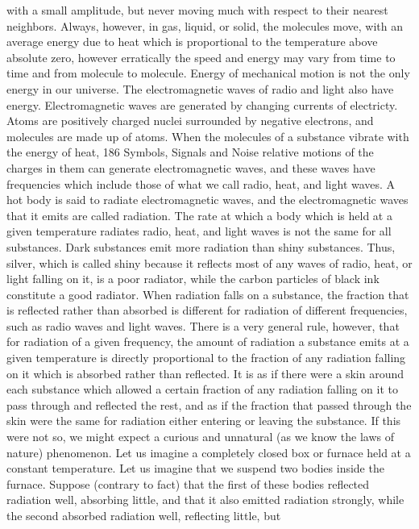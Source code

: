 {{{{{{{{{{{with a small amplitude, but never moving much with respect to
their nearest neighbors. Always, however, in gas, liquid, or solid,
the molecules move, with an average energy due to heat which is
proportional to the temperature above absolute zero, however
erratically the speed and energy may vary from time to time and
from molecule to molecule.
Energy of mechanical motion is not the only energy in our
universe. The electromagnetic waves of radio and light also have
energy. Electromagnetic waves are generated by changing currents
of electricty. Atoms are positively charged nuclei surrounded by
negative electrons, and molecules are made up of atoms. When
the molecules of a substance vibrate with the energy of heat,
186
Symbols,
Signals and Noise
relative motions of the charges in them can generate electromagnetic
waves, and these waves have frequencies which include those
of what we call radio, heat, and light waves. A hot body is said
to radiate electromagnetic waves, and the electromagnetic waves
that it emits are called radiation.
The rate at which a body which is held at a given temperature
radiates radio, heat, and light waves is not the same for all substances.
Dark substances emit more radiation than shiny substances.
Thus, silver, which is called shiny because it reflects most
of any waves of radio, heat, or light falling on it, is a poor radiator,
while the carbon particles of black ink constitute a good radiator.
When radiation falls on a substance, the fraction that is reflected
rather than absorbed is different for radiation of different frequencies,
such as radio waves and light waves. There is a very general
rule, however, that for radiation of a given frequency, the amount
of radiation a substance emits at a given temperature is directly
proportional to the fraction of any radiation falling on it which is
absorbed rather than reflected. It is as if there were a skin around
each substance which allowed a certain fraction of any radiation
falling on it to pass through and reflected the rest, and as if the
fraction that passed through the skin were the same for radiation
either entering or leaving the substance.
If this were not so, we might expect a curious and unnatural (as
we know the laws of nature) phenomenon. Let us imagine a completely
closed box or furnace held at a constant temperature. Let
us imagine that we suspend two bodies inside the furnace. Suppose
(contrary to fact) that the first of these bodies reflected radiation
well, absorbing little, and that it also emitted radiation strongly,
while the second absorbed radiation well, reflecting little, but
}}}}}}}}}}}

